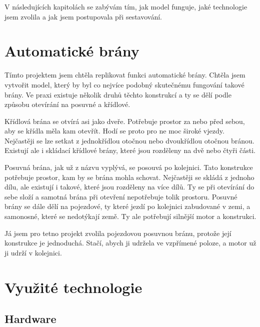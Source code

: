 \documentclass[12pt, a4paper,
twoside,        %
openright
]{report}
\begin{document}
	V následujících kapitolách se zabývám tím, jak model funguje, jaké technologie jsem zvolila a jak jsem postupovala při sestavování. 
	
	
	
	\chapter{Automatické brány}
	Tímto projektem jsem chtěla replikovat funkci automatické brány. Chtěla jsem vytvořit model, který by byl co nejvíce podobný skutečnému fungování takové brány. Ve praxi existuje několik druhů těchto konstrukcí a ty se dělí podle způsobu otevírání na posuvné a křídlové. 
	
	Křídlová brána se otvírá asi jako dveře. Potřebuje prostor za nebo před sebou, aby se křídla měla kam otevřít. Hodí se proto pro ne moc široké vjezdy. Nejčastěji se lze setkat z jednokřídlou otočnou nebo dvoukřídlou otočnou bránou. Existují ale i skládací křídlové brány, které jsou rozděleny na dvě nebo čtyři části.
	
	Posuvná brána, jak už z názvu vyplývá, se posouvá po kolejnici. Tato konstrukce potřebuje prostor, kam by se brána mohla schovat. Nejčastěji se skládá z jednoho dílu, ale existují i takové, které jsou rozděleny na více dílů. Ty se při otevírání do sebe složí a samotná brána při otevření nepotřebuje tolik prostoru. Posuvné brány se dále dělí na pojezdové, ty které jezdí po kolejnici zabudované v zemi, a samonosné, které se nedotýkají země. Ty ale potřebují silnější motor a konstrukci.
	
	Já jsem pro tetno projekt zvolila pojezdovou posuvnou bránu, protože její konstrukce je jednoduchá. Stačí, abych ji udržela ve vzpřímené poloze, a motor už ji udrží v kolejnici.
	
	
	
	
	
	
	\chapter{Využité technologie}
	\pagestyle{fancy}
	\section[Hardware]{Hardware} %
\end{document}
